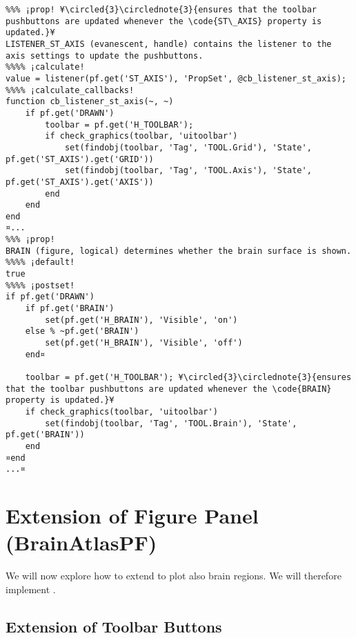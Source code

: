 \documentclass{tufte-handout}
\begin{document}
\begin{lstlisting}
%%% ¡prop! ¥\circled{3}\circlednote{3}{ensures that the toolbar pushbuttons are updated whenever the \code{ST\_AXIS} property is updated.}¥
LISTENER_ST_AXIS (evanescent, handle) contains the listener to the axis settings to update the pushbuttons.
%%%% ¡calculate!
value = listener(pf.get('ST_AXIS'), 'PropSet', @cb_listener_st_axis); 
%%%% ¡calculate_callbacks!
function cb_listener_st_axis(~, ~)
    if pf.get('DRAWN')
        toolbar = pf.get('H_TOOLBAR');
        if check_graphics(toolbar, 'uitoolbar')
            set(findobj(toolbar, 'Tag', 'TOOL.Grid'), 'State', pf.get('ST_AXIS').get('GRID'))
            set(findobj(toolbar, 'Tag', 'TOOL.Axis'), 'State', pf.get('ST_AXIS').get('AXIS'))
        end
    end
end
¤...
%%% ¡prop!
BRAIN (figure, logical) determines whether the brain surface is shown.
%%%% ¡default!
true
%%%% ¡postset!
if pf.get('DRAWN')
    if pf.get('BRAIN')
        set(pf.get('H_BRAIN'), 'Visible', 'on')
    else % ~pf.get('BRAIN') 
        set(pf.get('H_BRAIN'), 'Visible', 'off')
    end¤

    toolbar = pf.get('H_TOOLBAR'); ¥\circled{3}\circlednote{3}{ensures that the toolbar pushbuttons are updated whenever the \code{BRAIN} property is updated.}¥
    if check_graphics(toolbar, 'uitoolbar')
        set(findobj(toolbar, 'Tag', 'TOOL.Brain'), 'State', pf.get('BRAIN'))
    end
¤end
...¤
\end{lstlisting}

\section{Extension of Figure Panel (BrainAtlasPF)}

We will now explore how to extend  to plot also brain regions. We will therefore implement .

\subsection{Extension of Toolbar Buttons}

%
%
\end{document}
